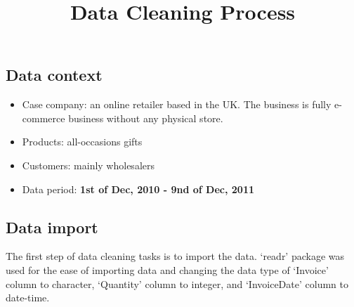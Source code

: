 \documentclass[
]{article}
\title{Data Cleaning Process}
\author{}
\date{\vspace{-2.5em}}
\newenvironment{Shaded}{\begin{snugshade}}{\end{snugshade}}
\newcommand{\CommentTok}[1]{\textcolor[rgb]{0.56,0.35,0.01}{\textit{#1}}}
\newcommand{\DataTypeTok}[1]{\textcolor[rgb]{0.13,0.29,0.53}{#1}}
\newcommand{\KeywordTok}[1]{\textcolor[rgb]{0.13,0.29,0.53}{\textbf{#1}}}
\newcommand{\NormalTok}[1]{#1}
\newcommand{\StringTok}[1]{\textcolor[rgb]{0.31,0.60,0.02}{#1}}
\providecommand{\tightlist}{%
  \setlength{\itemsep}{0pt}\setlength{\parskip}{0pt}}
\begin{document}
\maketitle

\hypertarget{data-context}{%
\subsection{Data context}\label{data-context}}

\begin{itemize}
\tightlist
\item
  Case company: an online retailer based in the UK. The business is
  fully e-commerce business without any physical store.
\item
  Products: all-occasions gifts
\item
  Customers: mainly wholesalers
\item
  Data period: \textbf{1st of Dec, 2010 - 9nd of Dec, 2011}
\end{itemize}

\hypertarget{data-import}{%
\subsection{Data import}\label{data-import}}

The first step of data cleaning tasks is to import the data. `readr'
package was used for the ease of importing data and changing the data
type of `Invoice' column to character, `Quantity' column to integer, and
`InvoiceDate' column to date-time.

\begin{Shaded}
\end{Shaded}
\end{document}
